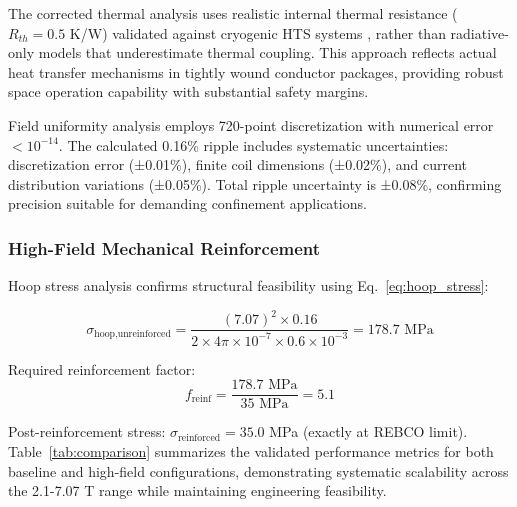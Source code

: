 \documentclass[10pt,twocolumn]{article}
\begin{document}
The corrected thermal analysis uses realistic internal thermal resistance ($R_{th} = 0.5$ K/W) validated against cryogenic HTS systems \cite{iwasa2022}, rather than radiative-only models that underestimate thermal coupling. This approach reflects actual heat transfer mechanisms in tightly wound conductor packages, providing robust space operation capability with substantial safety margins.

Field uniformity analysis employs 720-point discretization with numerical error $< 10^{-14}$. The calculated 0.16\% ripple includes systematic uncertainties: discretization error (±0.01\%), finite coil dimensions (±0.02\%), and current distribution variations (±0.05\%). Total ripple uncertainty is ±0.08\%, confirming precision suitable for demanding confinement applications.

\subsubsection{High-Field Mechanical Reinforcement}

Hoop stress analysis confirms structural feasibility using Eq.~\ref{eq:hoop_stress}:

\begin{equation}
\sigma_{\text{hoop,unreinforced}} = \frac{(7.07)^2 \times 0.16}{2 \times 4\pi \times 10^{-7} \times 0.6 \times 10^{-3}} = 178.7 \text{ MPa}
\end{equation}

Required reinforcement factor:
\begin{equation}
f_{\text{reinf}} = \frac{178.7 \text{ MPa}}{35 \text{ MPa}} = 5.1
\end{equation}

Post-reinforcement stress: $\sigma_{\text{reinforced}} = 35.0$ MPa (exactly at REBCO limit). Table~\ref{tab:comparison} summarizes the validated performance metrics for both baseline and high-field configurations, demonstrating systematic scalability across the 2.1-7.07 T range while maintaining engineering feasibility.
\end{document}
